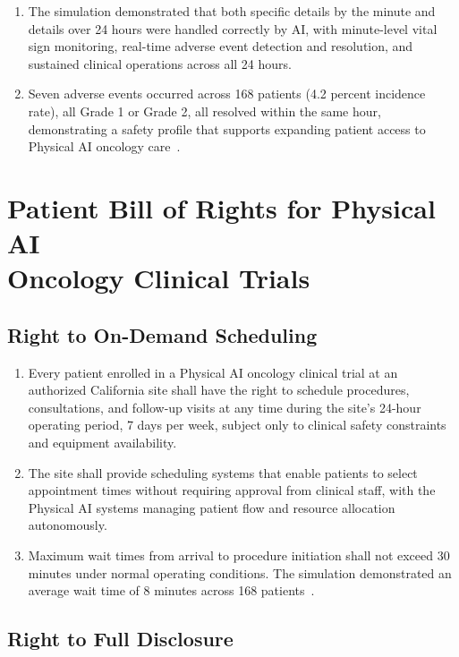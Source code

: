 \begin{enumerate}[label=(\alph*)]
\item The simulation demonstrated that both specific details by the minute and
  details over 24 hours were handled correctly by AI, with minute-level vital
  sign monitoring, real-time adverse event detection and resolution, and
  sustained clinical operations across all 24 hours.

\item Seven adverse events occurred across 168 patients (4.2 percent incidence
  rate), all Grade 1 or Grade 2, all resolved within the same hour,
  demonstrating a safety profile that supports expanding patient access to
  Physical AI oncology care~\cite{newtrial2026}.
\end{enumerate}

\section{Patient Bill of Rights for Physical AI\\Oncology Clinical Trials}

\subsection{Right to On-Demand Scheduling}

\begin{enumerate}[label=(\alph*)]
\item Every patient enrolled in a Physical AI oncology clinical trial at an
  authorized California site shall have the right to schedule procedures,
  consultations, and follow-up visits at any time during the site's 24-hour
  operating period, 7 days per week, subject only to clinical safety
  constraints and equipment availability.

\item The site shall provide scheduling systems that enable patients to select
  appointment times without requiring approval from clinical staff, with the
  Physical AI systems managing patient flow and resource allocation
  autonomously.

\item Maximum wait times from arrival to procedure initiation shall not exceed
  30 minutes under normal operating conditions. The simulation demonstrated
  an average wait time of 8 minutes across 168
  patients~\cite{newtrial2026}.
\end{enumerate}

\subsection{Right to Full Disclosure}

